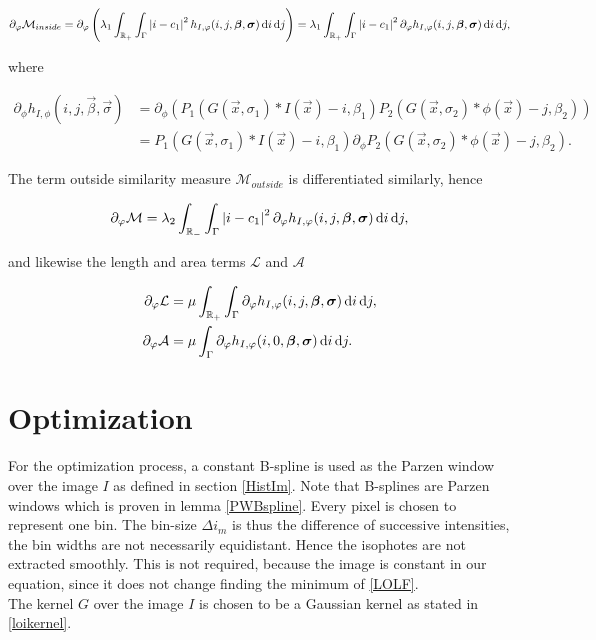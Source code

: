 \begin{equation}
  \partial_\varphi \mathcal{M}_{inside} = \partial_\varphi \left( \lambda_1\int_{\mathbb R_+} \int_{\Gamma} \left| {i-c_1} \right|^2h_{I,\varphi}(i,j,\boldsymbol{\beta} ,\boldsymbol{\sigma} )\,{\rm d} i\,{\rm d} j\right) = \lambda_1\int_{\mathbb R_+} \int_{\Gamma} \left| {i-c_1} \right|^2 \partial_\varphi h_{I,\varphi}(i,j,\boldsymbol{\beta} ,\boldsymbol{\sigma} )\,{\rm d} i\,{\rm d} j,
\end{equation}

where

\begin{equation}
  \begin{split}
    \partial_\phi h_{I,\phi}(i,j,\vec{\beta},\vec{\sigma}) &= \partial_\phi \left(P_1(G(\vec{x},\sigma_1)*I(\vec{x})-i,\beta_1)P_2(G(\vec{x},\sigma_2)*\phi(\vec{x})-j,\beta_2)\right)\\ 
    &= P_1(G(\vec{x},\sigma_1)*I(\vec{x})-i,\beta_1)\partial_\phi P_2(G(\vec{x},\sigma_2)*\phi(\vec{x})-j,\beta_2).
  \end{split}
\end{equation}

The term outside similarity measure $\mathcal{M}_{outside}$ is differentiated similarly, hence

\begin{equation}
\partial_\varphi \mathcal{M} = \lambda_2\int_{\mathbb R_-} \int_{\Gamma} \left| {i-c_1} \right|^2 \partial_\varphi h_{I,\varphi}(i,j,\boldsymbol{\beta} ,\boldsymbol{\sigma} )\,{\rm d} i\,{\rm d} j,
\end{equation}

and likewise the length and area terms $\mathcal{L}$ and $\mathcal{A}$

\begin{align}
  \partial_\varphi \mathcal{L} &= \mu \int_{\mathbb R_+} \int_{\Gamma} \partial_\varphi h_{I,\varphi}(i,j,\boldsymbol{\beta} ,\boldsymbol{\sigma} )\,{\rm d} i\,{\rm d} j,\\
  \partial_\varphi \mathcal{A} &= \mu  \int_{\Gamma} \partial_\varphi h_{I,\varphi}(i,0,\boldsymbol{\beta} ,\boldsymbol{\sigma} )\,{\rm d} i\,{\rm d} j.
\end{align}

\section{Optimization}\label{section:OLopt}
For the optimization process, a constant B-spline is used as the Parzen window over the image $I$ as defined in section \ref{HistIm}. Note that B-splines are Parzen windows which is proven in lemma \eqref{PWBspline}. Every pixel is chosen to represent one bin. The bin-size $\Delta i_m$ is thus the difference of successive intensities, the bin widths are not necessarily equidistant. Hence the isophotes are not extracted smoothly. This is not required, because the image is constant in our equation, since it does not change finding the minimum of \eqref{LOLF}.\\
The kernel $G$ over the image $I$ is chosen to be a Gaussian kernel as stated in \eqref{loikernel}. 

